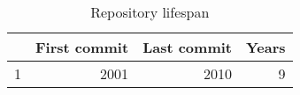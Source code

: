 \begin{table}[ht]
\begin{center}
\begin{tabular}{rrrr}
  \hline
 & First commit & Last commit & Years \\ 
  \hline
1 & 2001 & 2010 &   9 \\ 
   \hline
\end{tabular}
\caption{Repository lifespan}
\end{center}
\end{table}
